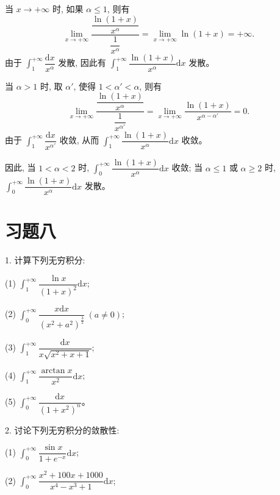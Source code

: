 \documentclass[UTF8, 12pt, fontset=fandol, oneside]{ctexart}
\begin{document}
当 $x\to+\infty$ 时, 如果 $\alpha\leq1$, 则有
\[
  \lim_{x\to+\infty}
  \frac{\dfrac{\ln(1+x)}{x^\alpha}}{\dfrac1{x^\alpha}}
  =
  \lim_{x\to+\infty}\ln(1+x)=+\infty.
\]
由于 $\int_1^{+\infty}\dfrac{\mathrm dx}{x^\alpha}$ 发散, 因此有 $\int_1^{+\infty}\dfrac{\ln(1+x)}{x^\alpha}\mathrm dx$ 发散。

当 $\alpha>1$ 时, 取 $\alpha'$, 使得 $1<\alpha'<\alpha$, 则有
\[
  \lim_{x\to+\infty}
  \frac{\dfrac{\ln(1+x)}{x^\alpha}}{\dfrac1{x^{\alpha'}}}
  =
  \lim_{x\to+\infty}\frac{\ln(1+x)}{x^{\alpha-\alpha'}}=0.
\]
由于 $\int_1^{+\infty}\dfrac{\mathrm dx}{x^{\alpha'}}$ 收敛, 从而 $\int_1^{+\infty}\dfrac{\ln(1+x)}{x^\alpha}\mathrm dx$ 收敛。

因此, 当 $1<\alpha<2$ 时, $\int_0^{+\infty}\dfrac{\ln(1+x)}{x^\alpha}\mathrm dx$ 收敛; 当 $\alpha\leq1$ 或 $\alpha\geq2$ 时, $\int_0^{+\infty}\dfrac{\ln(1+x)}{x^\alpha}\mathrm dx$ 发散。

\section*{习题八}

1. 计算下列无穷积分:

(1) $\int_1^{+\infty}\dfrac{\ln x}{(1+x)^2}\mathrm dx$;

(2) $\int_0^{+\infty}\dfrac{x\mathrm dx}{(x^2+a^2)^{\frac32}}\ (a\ne0)$;

(3) $\int_1^{+\infty}\dfrac{\mathrm dx}{x\sqrt{x^2+x+1}}$;

(4) $\int_1^{+\infty}\dfrac{\arctan x}{x^2}\mathrm dx$;

(5) $\int_0^{+\infty}\dfrac{\mathrm dx}{(1+x^2)^n}$。

2. 讨论下列无穷积分的敛散性:

(1) $\int_0^{+\infty}\dfrac{\sin x}{1+e^{-x}}\mathrm dx$;

(2) $\int_0^{+\infty}\dfrac{x^2+100x+1000}{x^4-x^3+1}\mathrm dx$;
\end{document}
